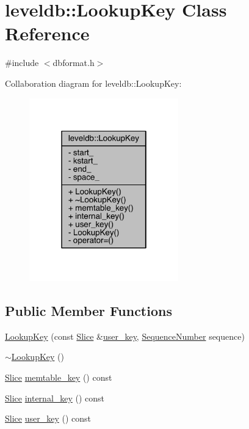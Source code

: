 \hypertarget{classleveldb_1_1_lookup_key}{}\section{leveldb\+:\+:Lookup\+Key Class Reference}
\label{classleveldb_1_1_lookup_key}


{\ttfamily \#include $<$dbformat.\+h$>$}



Collaboration diagram for leveldb\+:\+:Lookup\+Key\+:\nopagebreak
\begin{figure}[H]
\begin{center}
\leavevmode
\includegraphics[width=183pt]{classleveldb_1_1_lookup_key__coll__graph}
\end{center}
\end{figure}
\subsection*{Public Member Functions}
\begin{DoxyCompactItemize}
\item 
\hyperlink{classleveldb_1_1_lookup_key_acd09aa56607ced962e1b458d05d53472}{Lookup\+Key} (const \hyperlink{classleveldb_1_1_slice}{Slice} \&\hyperlink{classleveldb_1_1_lookup_key_adf91e9804383dd1b2bfd8545df45342f}{user\+\_\+key}, \hyperlink{namespaceleveldb_a5481ededd221c36d652c371249f869fa}{Sequence\+Number} sequence)
\item 
\hyperlink{classleveldb_1_1_lookup_key_a1ed5751c159540217aa5d702fdf83a98}{$\sim$\+Lookup\+Key} ()
\item 
\hyperlink{classleveldb_1_1_slice}{Slice} \hyperlink{classleveldb_1_1_lookup_key_a16b7ee6c701da7e7503510880a106a3a}{memtable\+\_\+key} () const 
\item 
\hyperlink{classleveldb_1_1_slice}{Slice} \hyperlink{classleveldb_1_1_lookup_key_a3578de91f795e450b05a870795339b40}{internal\+\_\+key} () const 
\item 
\hyperlink{classleveldb_1_1_slice}{Slice} \hyperlink{classleveldb_1_1_lookup_key_adf91e9804383dd1b2bfd8545df45342f}{user\+\_\+key} () const 
\end{DoxyCompactItemize}
